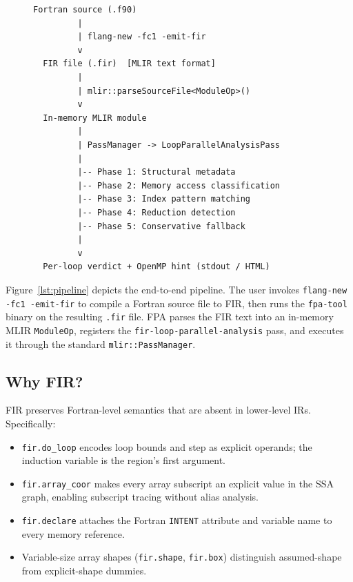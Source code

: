 \documentclass[conference]{IEEEtran}
\begin{document}
\begin{figure}[t]
\centering
\begin{lstlisting}[language={},caption={FPA analysis pipeline overview.},label={lst:pipeline},numbers=none,frame=none]
  Fortran source (.f90)
         |
         | flang-new -fc1 -emit-fir
         v
  FIR file (.fir)  [MLIR text format]
         |
         | mlir::parseSourceFile<ModuleOp>()
         v
  In-memory MLIR module
         |
         | PassManager -> LoopParallelAnalysisPass
         |
         |-- Phase 1: Structural metadata
         |-- Phase 2: Memory access classification
         |-- Phase 3: Index pattern matching
         |-- Phase 4: Reduction detection
         |-- Phase 5: Conservative fallback
         |
         v
  Per-loop verdict + OpenMP hint (stdout / HTML)
\end{lstlisting}
\end{figure}

Figure~\ref{lst:pipeline} depicts the end-to-end pipeline.
The user invokes \texttt{flang-new -fc1 -emit-fir} to compile a
Fortran source file to FIR, then runs the \texttt{fpa-tool} binary on
the resulting \texttt{.fir} file.  FPA parses the FIR text into an
in-memory MLIR \texttt{ModuleOp}, registers the
\texttt{fir-loop-parallel-analysis} pass, and executes it through the
standard \texttt{mlir::PassManager}.

\subsection{Why FIR?}

FIR preserves Fortran-level semantics that are absent in lower-level
IRs.  Specifically:
\begin{itemize}
  \item \texttt{fir.do\_loop} encodes loop bounds and step as explicit
        operands; the induction variable is the region's first
        argument.
  \item \texttt{fir.array\_coor} makes every array subscript an
        explicit value in the SSA graph, enabling subscript tracing
        without alias analysis.
  \item \texttt{fir.declare} attaches the Fortran \texttt{INTENT}
        attribute and variable name to every memory reference.
  \item Variable-size array shapes (\texttt{fir.shape},
        \texttt{fir.box}) distinguish assumed-shape from
        explicit-shape dummies.
\end{itemize}
\end{document}
